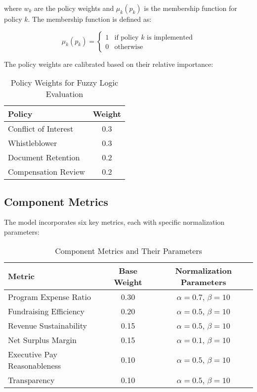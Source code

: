 \documentclass[12pt]{article}
\begin{document}
where $w_k$ are the policy weights and $\mu_k(p_k)$ is the membership function for policy $k$. The membership function is defined as:

\begin{equation}
    \mu_k(p_k) = 
    \begin{cases}
    1 & \text{if policy } k \text{ is implemented} \\
    0 & \text{otherwise}
    \end{cases}
\end{equation}

The policy weights are calibrated based on their relative importance:

\begin{table}[h]
\centering
\begin{tabular}{|l|c|}
\hline
\textbf{Policy} & \textbf{Weight} \\
\hline
Conflict of Interest & 0.3 \\
Whistleblower & 0.3 \\
Document Retention & 0.2 \\
Compensation Review & 0.2 \\
\hline
\end{tabular}
\caption{Policy Weights for Fuzzy Logic Evaluation}
\label{tab:policy_weights}
\end{table}

\subsection{Component Metrics}

The model incorporates six key metrics, each with specific normalization parameters:

\begin{table}[h]
\centering
\begin{tabular}{|l|c|c|}
\hline
\textbf{Metric} & \textbf{Base Weight} & \textbf{Normalization Parameters} \\
\hline
Program Expense Ratio & 0.30 & $\alpha = 0.7$, $\beta = 10$ \\
Fundraising Efficiency & 0.20 & $\alpha = 0.5$, $\beta = 10$ \\
Revenue Sustainability & 0.15 & $\alpha = 0.5$, $\beta = 10$ \\
Net Surplus Margin & 0.15 & $\alpha = 0.1$, $\beta = 10$ \\
Executive Pay Reasonableness & 0.10 & $\alpha = 0.5$, $\beta = 10$ \\
Transparency & 0.10 & $\alpha = 0.5$, $\beta = 10$ \\
\hline
\end{tabular}
\caption{Component Metrics and Their Parameters}
\label{tab:metrics}
\end{table}
\end{document}
